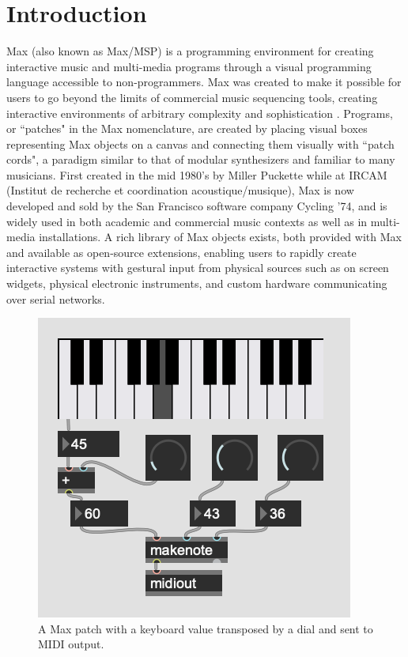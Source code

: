 \documentclass[acmsmall]{acmart}
\begin{document}

\maketitle

\section{Introduction}

Max (also known as Max/MSP) is a programming environment for creating interactive 
music and multi-media programs through a visual programming language accessible 
to non-programmers. Max was created to make it possible for users
to go beyond the limits of commercial music sequencing tools, creating
interactive environments of arbitrary complexity and sophistication
\cite{Zicarelli2002}.
Programs, or ``patches" in the Max nomenclature, are created by placing
visual boxes representing Max objects on a canvas and connecting them visually with
``patch cords", a paradigm similar to that of modular synthesizers and familiar to many musicians.
First created in the mid 1980's by Miller Puckette while at IRCAM 
(Institut de recherche et coordination acoustique/musique), 
Max is now developed and sold by the San Francisco software company Cycling '74,
and is widely used in both academic and commercial music contexts as well
as in multi-media installations. A rich library of Max objects exists, 
both provided with Max and available as open-source 
extensions, enabling users to rapidly create interactive systems with gestural 
input from physical sources such as on screen widgets, physical electronic instruments,
and custom hardware communicating over serial networks.

\begin{figure}[h]
  \centering
  \includegraphics[width=.5\linewidth]{fig-1}
  \caption{A Max patch with a keyboard value transposed by a dial and sent to MIDI output.}
  \Description{}
\end{figure}
\end{document}
